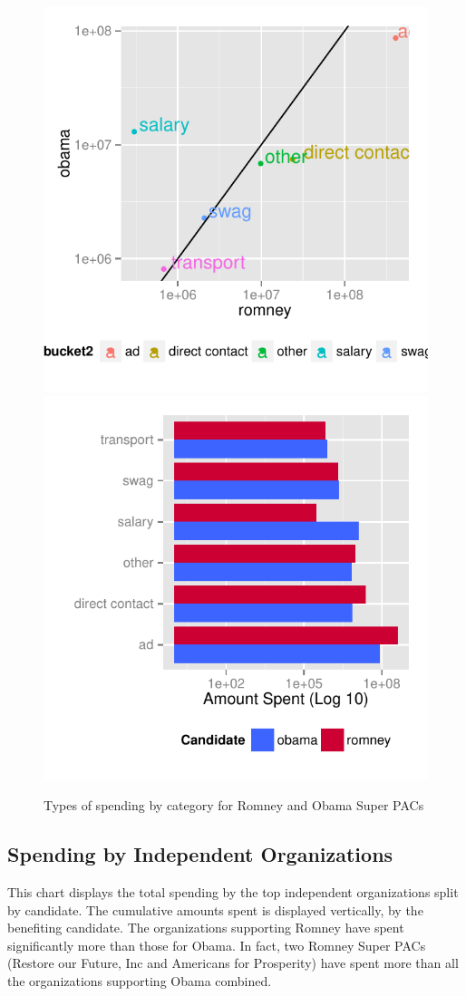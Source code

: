 \documentclass[11pt]{article}\usepackage{graphicx, color}
\newenvironment{knitrout}{}{} %
\begin{document}
\begin{knitrout}
\color{fgcolor}\begin{figure}[H]


{\centering \includegraphics[width=.4\textwidth]{figure/type_plot1} \includegraphics[width=.4\textwidth]{figure/type_plot2} 

}

\caption[Types of spending by category for Romney and Obama Super PACs]{Types of spending by category for Romney and Obama Super PACs\label{fig:type_plot}}
\end{figure}

\end{knitrout}


\subsection{Spending by Independent Organizations}
This chart displays the total spending by the top independent organizations split by candidate. The cumulative amounts spent is displayed vertically, by the benefiting candidate. The organizations supporting Romney have spent significantly more than those for Obama. In fact, two Romney Super PACs (Restore our Future, Inc and Americans for Prosperity) have spent more than all the organizations supporting Obama combined.
\end{document}

